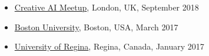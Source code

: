 \documentclass[paper=letter,fontsize=11pt]{scrartcl} %
\newcommand{\TalkEntry}[4]{
        \noindent \href{#4}{#1}, #2, #3 }
\begin{document}
\begin{itemize}
\item\TalkEntry{Creative AI Meetup}{London, UK}{September 2018}{https://interests.me/org/communitytechevents/story/94296} %

\item\TalkEntry{%
Boston University}{Boston, USA}{March 2017}{} %

\item\TalkEntry{%
University of Regina}{Regina, Canada}{January 2017}{} %
\end{itemize}
\end{document}
